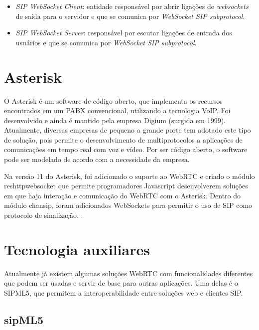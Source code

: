 \documentclass[12pt,a4paper,oneside]{report}
\begin{document}
\begin{itemize}
  \item \textit{SIP WebSocket Client}: entidade responsável por abrir ligações de \textit{websockets} de saída para o servidor e que se comunica por \textit{WebSocket SIP subprotocol}.
  \item \textit{SIP WebSocket Server}: responsável por escutar ligações de entrada dos usuários e que se comunica por \textit{WebSocket SIP subprotocol}.
\end{itemize}


\section{Asterisk}
\label{s_asterisk}
O Asterisk é um software de código aberto, que implementa os recursos encontrados em um PABX convencional, utilizando a tecnologia VoIP. Foi desenvolvido e ainda é mantido pela empresa Digium (surgida em 1999). 
Atualmente, diversas empresas de pequeno a grande porte tem adotado este tipo de solução, pois permite o desenvolvimento de multiprotocolos a aplicações de comunicações em tempo real com voz e vídeo. Por ser código aberto, o software pode ser modelado de acordo com a necessidade da empresa.

Na versão 11 do Asterisk, foi adicionado o suporte ao WebRTC e criado o módulo res\underline{\hspace{.10in}}http\underline{\hspace{.10in}}websocket que permite programadores Javascript desenvolverem soluções em que haja interação e comunicação do WebRTC com o Asterisk. Dentro do módulo chan\underline{\hspace{.10in}}sip, foram adicionados WebSockets para permitir o uso de SIP como protocolo de sinalização. \cite{Amaral:2013}.

\section{Tecnologia auxiliares}
\label{s_tecAuxiliares}
Atualmente já existem algumas soluções WebRTC com funcionalidades diferentes que podem ser usadas e servir de base para outras aplicações. Uma delas é o SIPML5, que permitem a interoperabilidade entre soluções web e clientes SIP. 


\subsection{sipML5}
\label{ss_sipml5}
\end{document}
